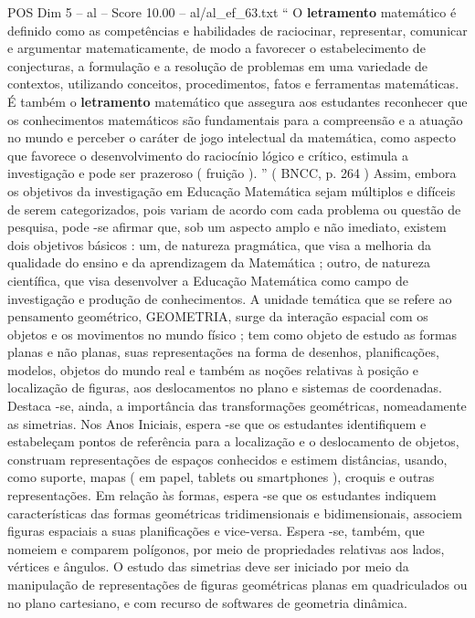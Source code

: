 \begin{textsample}{POS Dim 5 – al – Score 10.00 – al/al\_ef\_63.txt}  \label{ex:f5_pos_043}
“ O \textbf{letramento} matemático é definido como as competências e habilidades de raciocinar, representar, comunicar e argumentar matematicamente, de modo a favorecer o estabelecimento de conjecturas, a formulação e a resolução de problemas em uma variedade de contextos, utilizando conceitos, procedimentos, fatos e ferramentas matemáticas.
É também o \textbf{letramento} matemático que assegura aos estudantes reconhecer que os conhecimentos matemáticos são fundamentais para a compreensão e a atuação no mundo e perceber o caráter de jogo intelectual da matemática, como aspecto que favorece o desenvolvimento do raciocínio lógico e crítico, estimula a investigação e pode ser prazeroso ( fruição ). ” ( BNCC, p. 264 ) Assim, embora os objetivos da investigação em Educação Matemática sejam múltiplos e difíceis de serem categorizados, pois variam de acordo com cada problema ou questão de pesquisa, pode -se afirmar que, sob um aspecto amplo e não imediato, existem dois objetivos básicos : um, de natureza pragmática, que visa a melhoria da qualidade do ensino e da aprendizagem da Matemática ; outro, de natureza científica, que visa desenvolver a Educação Matemática como campo de investigação e produção de conhecimentos.
A unidade temática que se refere ao pensamento geométrico, GEOMETRIA, surge da interação espacial com os objetos e os movimentos no mundo físico ; tem como objeto de estudo as formas planas e não planas, suas representações na forma de desenhos, planificações, modelos, objetos do mundo real e também as noções relativas à posição e localização de figuras, aos deslocamentos no plano e sistemas de coordenadas.
Destaca -se, ainda, a importância das transformações geométricas, nomeadamente as simetrias.
Nos Anos Iniciais, espera -se que os estudantes identifiquem e estabeleçam pontos de referência para a localização e o deslocamento de objetos, construam representações de espaços conhecidos e estimem distâncias, usando, como suporte, mapas ( em papel, tablets ou smartphones ), croquis e outras representações.
Em relação às formas, espera -se que os estudantes indiquem características das formas geométricas tridimensionais e bidimensionais, associem figuras espaciais a suas planificações e vice-versa.
Espera -se, também, que nomeiem e comparem polígonos, por meio de propriedades relativas aos lados, vértices e ângulos.
O estudo das simetrias deve ser iniciado por meio da manipulação de representações de figuras geométricas planas em quadriculados ou no plano cartesiano, e com recurso de softwares de geometria dinâmica.

\end{textsample}
